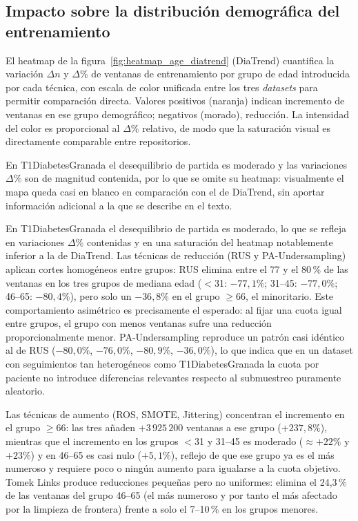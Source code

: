 \subsection{Impacto sobre la distribución demográfica del entrenamiento}
\label{subsec:impacto_demografico}

El heatmap de la figura~\ref{fig:heatmap_age_diatrend} (DiaTrend) cuantifica
la variación $\Delta n$ y $\Delta\%$ de ventanas de entrenamiento por grupo
de edad introducida por cada técnica, con escala de color unificada entre los
tres \textit{datasets} para permitir comparación directa. Valores positivos
(naranja) indican incremento de ventanas en ese grupo demográfico; negativos
(morado), reducción. La intensidad del color es proporcional al $\Delta\%$
relativo, de modo que la saturación visual es directamente comparable entre
repositorios.

En T1DiabetesGranada el desequilibrio de partida es moderado y las variaciones 
$\Delta\%$ son de magnitud contenida, por lo que se omite su heatmap: visualmente el mapa queda casi en blanco en comparación con el de DiaTrend, sin aportar información adicional a la que se describe en el texto.

En T1DiabetesGranada el desequilibrio de partida es moderado, lo que se
refleja en variaciones $\Delta\%$ contenidas y en una saturación del heatmap
notablemente inferior a la de DiaTrend. Las técnicas de reducción (RUS y
PA-Undersampling) aplican cortes homogéneos entre grupos: RUS elimina
entre el 77 y el 80\,\% de las ventanas en los tres grupos de mediana edad
($<$31: $-77{,}1\%$; 31--45: $-77{,}0\%$; 46--65: $-80{,}4\%$), pero solo
un $-36{,}8\%$ en el grupo $\geq$66, el minoritario. Este comportamiento
asimétrico es precisamente el esperado: al fijar una cuota igual entre grupos,
el grupo con menos ventanas sufre una reducción proporcionalmente menor.
PA-Undersampling reproduce un patrón casi idéntico al de RUS ($-80{,}0\%$,
$-76{,}0\%$, $-80{,}9\%$, $-36{,}0\%$), lo que indica que en un dataset
con seguimientos tan heterogéneos como T1DiabetesGranada la cuota por
paciente no introduce diferencias relevantes respecto al submuestreo puramente
aleatorio.

Las técnicas de aumento (ROS, SMOTE, Jittering) concentran el incremento en
el grupo $\geq$66: las tres añaden $+3\,925\,200$ ventanas a ese grupo
($+237{,}8\%$), mientras que el incremento en los grupos $<$31 y 31--45 es
moderado ($\approx+22\%$ y $+23\%$) y en 46--65 es casi nulo ($+5{,}1\%$),
reflejo de que ese grupo ya es el más numeroso y requiere poco o ningún
aumento para igualarse a la cuota objetivo. Tomek Links produce reducciones
pequeñas pero no uniformes: elimina el 24{,}3\,\% de las ventanas del grupo
46--65 (el más numeroso y por tanto el más afectado por la limpieza de
frontera) frente a solo el 7--10\,\% en los grupos menores.

